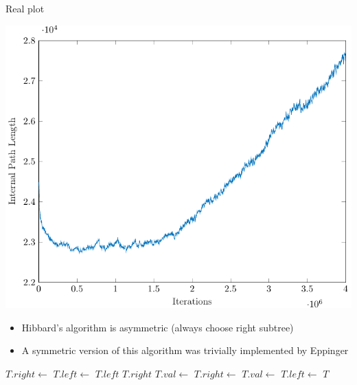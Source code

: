 \documentclass{beamer}
\begin{document}
\begin{frame}
    Real plot
    \begin{center}
        \includegraphics[scale=0.70]{iplDeleteFull.pdf}
    \end{center}
\end{frame}

\begin{frame}
    \begin{itemize}
        \item Hibbard's algorithm is asymmetric (always choose right subtree)
            \pause
        \item A symmetric version of this algorithm was trivially implemented by Eppinger
    \end{itemize}
\end{frame}

\begin{frame}
    \scriptsize
    \begin{algorithmic}
        \State $T.right \gets$ 
        \State $T.left \gets$ 
        \Else
        \State \Return $T.left$
        \State \Return $T.right$
        \Else
        \State $T.val \gets$ 
        \State $T.right \gets$ 
        \Else
        \State $T.val \gets$ 
        \State $T.left \gets$ 
        \EndIf
        \EndIf
        \EndIf
        \State \Return $T$
        \EndFunction
    \end{algorithmic}
\end{frame}
\end{document}
